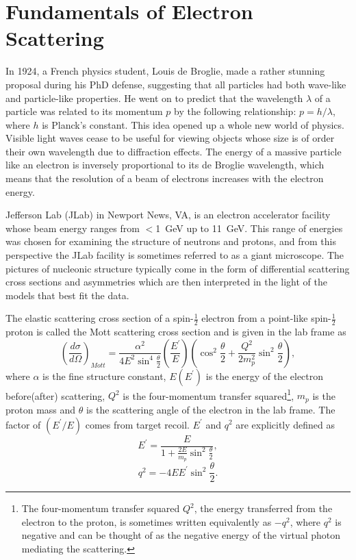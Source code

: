 \section{Fundamentals of Electron Scattering}
In 1924, a French physics student, Louis de Broglie, made a rather stunning proposal during his PhD defense, suggesting that all particles had both wave-like and particle-like properties. He went on to predict that the wavelength $\lambda$ of a particle was related to its momentum $p$ by the following relationship: $p=h/\lambda$, where $h$ is Planck's constant. This idea opened up a whole new world of physics. Visible light waves cease to be useful for viewing objects whose size is of order their own wavelength due to diffraction effects. The energy of a massive particle like an electron is inversely proportional to its de Broglie wavelength, which means that the resolution of a beam of electrons increases with the electron energy. 

Jefferson Lab (JLab) in Newport News, VA, is an electron accelerator facility whose beam energy ranges from $<$1~GeV up to 11~GeV. This range of energies was chosen for examining the structure of neutrons and protons, and from this perspective the JLab facility is sometimes referred to as a giant microscope. The pictures of nucleonic structure typically come in the form of differential scattering cross sections and asymmetries which are then interpreted in the light of the models that best fit the data.

The elastic scattering cross section of a spin-$\frac{1}{2}$ electron from a point-like spin-$\frac{1}{2}$ proton is called the Mott scattering cross section and is given in the lab frame as
\begin{equation}
\left(\frac{d\sigma}{d\Omega}\right)_{Mott}=\frac{\alpha^2}{4E^2\sin^4\frac{\theta}{2}}\left(\frac{E^{\prime}}{E}\right)\left(\cos^2\frac{\theta}{2}+\frac{Q^2}{2m_p^2}\sin^2\frac{\theta}{2}\right),
\label{eq:mott}
\end{equation} 
where $\alpha$ is the fine structure constant, $E(E^{\prime})$ is the energy of the electron before(after) scattering, $Q^2$ is the four-momentum transfer squared\footnote{The four-momentum transfer squared $Q^2$, the energy transferred from the electron to the proton, is sometimes written equivalently as $-q^2$, where $q^2$ is negative and can be thought of as the negative energy of the virtual photon mediating the scattering.}, $m_p$ is the proton mass and $\theta$ is the scattering angle of the electron in the lab frame\cite{Halzen}\cite{Bernauer}. The factor of $(E^{\prime}/E)$ comes from target recoil. $E^{\prime}$ and $q^2$ are explicitly defined as 
\[
E^{\prime}=\frac{E}{1+\frac{2E}{m_p}\sin^2\frac{\theta}{2}},
\]
\[
q^2=-4EE^{\prime}\sin^2\frac{\theta}{2}.
\]

